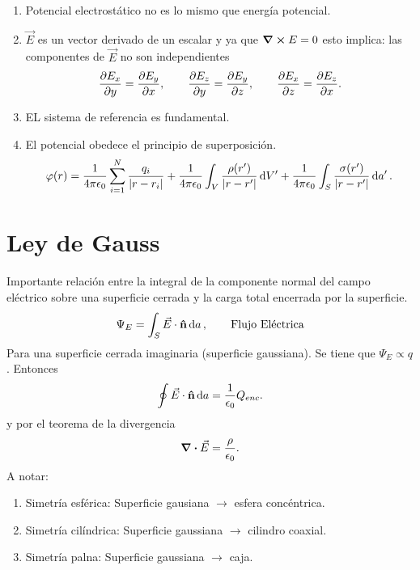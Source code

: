 \begin{enumerate}
	\item Potencial electrostático no es lo mismo que energía potencial.
	\item $\vec{E}$ es un vector derivado de un escalar y ya que $\curl{E} = 0$ esto implica: las componentes de $\vec{E}$ no son independientes
	\begin{equation}
		\pdv{E_x}{y} = \pdv{E_y}{x}, \qquad \pdv{E_z}{y} = \pdv{E_y}{z}, \qquad \pdv{E_x}{z} = \pdv{E_z}{x}.
	\end{equation}
	\item EL sistema de referencia es fundamental.
	\item El potencial obedece el principio de superposición.
	\begin{equation}
		\varphi (r) = \frac{1}{4\pi \epsilon_0} \sum_{i=1} ^N \frac{q_i}{\abs{r - r_i}} + \frac{1}{4\pi \epsilon_0} \int _V \frac{\rho (r')}{\abs{r-r'}} \dd{V'} + \frac{1}{4\pi \epsilon_0} \int _S \frac{\sigma (r')}{\abs{r - r'}} \dd{a'}.
	\end{equation}
\end{enumerate}

\section{Ley de Gauss}
Importante relación entre la integral de la componente normal del campo eléctrico sobre una superficie cerrada y la carga total encerrada por la superficie.
\begin{equation}
	\Psi _E = \int _S \vec{E} \cdot \vu{n} \dd{a}, \qquad \text{Flujo Eléctrica}
\end{equation}
Para una superficie cerrada imaginaria (superficie gaussiana). Se tiene que $\Psi _E \propto q$. Entonces
\begin{equation}
	\oint \vec{E} \cdot \vu{n} \dd{a} = \frac{1}{\epsilon_0} Q_{enc}.
\end{equation}
y por el teorema de la divergencia
\begin{equation}
	\div{\vec{E}} = \frac{\rho}{\epsilon_0}.
\end{equation}
A notar:
\begin{enumerate}
	\item Simetría esférica: Superficie gausiana $\to$ esfera concéntrica.
	\item Simetría cilíndrica: Superficie gaussiana $\to$ cilindro coaxial.
	\item Simetría palna: Superficie gaussiana $\to$ caja.
\end{enumerate}



